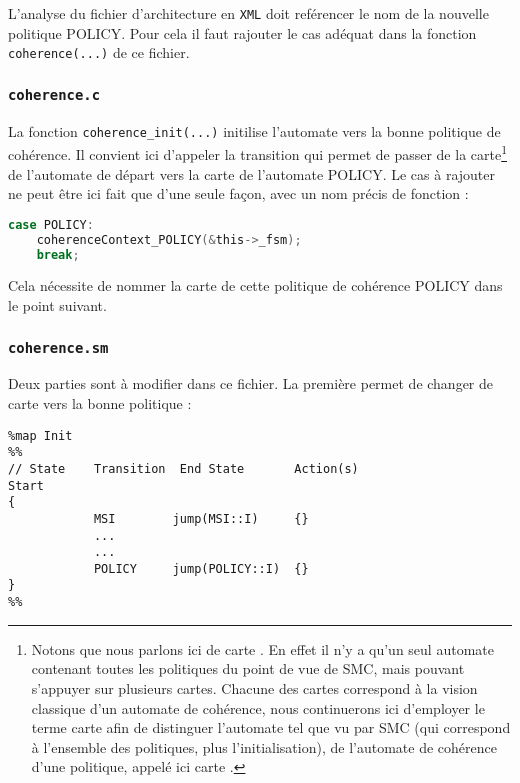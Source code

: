 L'analyse du fichier d'architecture en \texttt{XML} doit reférencer le nom de la nouvelle politique POLICY. Pour cela il faut rajouter le cas adéquat dans la fonction \texttt{coherence(...)} de ce fichier.

\subsubsection{\texttt{coherence.c}}

La fonction \texttt{coherence\_init(...)} initilise l'automate vers la bonne politique de cohérence. Il convient ici d'appeler la transition qui permet de passer de la carte\footnote{Notons que nous parlons ici de \og carte \fg. En effet il n'y a qu'un seul automate contenant toutes les politiques du point de vue de \textsf{SMC}, mais pouvant s'appuyer sur plusieurs cartes. Chacune des cartes correspond à la vision classique d'un automate de cohérence, nous continuerons ici d'employer le terme \og carte \fg afin de distinguer l'automate tel que vu par \textsf{SMC} (qui correspond à l'ensemble des politiques, plus l'initialisation), de l'automate de cohérence d'une politique, appelé ici \og carte \fg.} de l'automate de départ vers la carte de l'automate POLICY. Le cas à rajouter ne peut être ici fait que d'une seule façon, avec un nom précis de fonction :
\begin{framed}
\begin{lstlisting}[frame=none,language=C]
  case POLICY:
    coherenceContext_POLICY(&this->_fsm);
    break;
\end{lstlisting}
\end{framed}
Cela nécessite de nommer la carte de cette politique de cohérence POLICY dans le point suivant.

\subsubsection{\texttt{coherence.sm}}


Deux parties sont à modifier dans ce fichier. La première permet de changer de carte vers la bonne politique :
\begin{framed}
\begin{verbatim}
%map Init
%%
// State    Transition  End State       Action(s)
Start
{
            MSI        jump(MSI::I)     {}
            ...
            ...
            POLICY     jump(POLICY::I)  {}
}
%%
\end{verbatim}
\end{framed}

